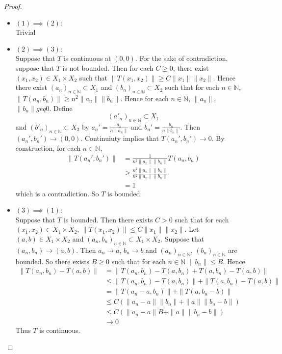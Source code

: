 \documentclass[12pt]{amsart}
\theoremstyle{definition}
\newcommand{\N}{\mathbb{N}}
\begin{document}
	\begin{proof}\
		\begin{itemize}
		\item $(1) \implies (2)$:\\
		Trivial
		\item  $(2) \implies (3)$:\\ 
		Suppose that $T$ is continuous at $(0, 0)$. For the sake of contradiction, suppose that $T$ is not bounded. Then for each $C \geq 0$, there exist $(x_1, x_2) \in X_1 \times X_2$ such that $\|T(x_1, x_2)\| \geq C\|x_1\| \|x_2\|$. Hence there exist $(a_n)_{n \in \N} \subset X_1$ and $(b_n)_{n \in \N} \subset X_2$ such that for each $n \in \N$, $ \| T(a_n, b_n) \| \geq n^2 \|a_n\| \|b_n\|$. Hence for each $n \in \N$, $\|a_n\|$, $\|b_n\|geq 0$. Define $$(a'_n)_{n \in \N} \subset X_1$$ and $(b'_n)_{n \in \N} \subset X_2$ by $a_n' = \frac{a_n}{n\|a_n\|}$ and $b_n' = \frac{b_n}{n\|b_n\|}$. Then $(a_n', b_n') \rightarrow (0,0)$. Continuiuty implies that $T(a_n',b_n') \rightarrow 0$. By construction, for each $n \in \N$,
		\begin{align*}
		\|T(a_n',b_n')\| 
		&= \frac{1}{n^2 \|a_n\| \|b_n\|} T(a_n, b_n) \\
		& \geq \frac{n^2 \|a_n\| \|b_n\|}{n^2 \|a_n\| \|b_n\|} \\
		&= 1
		\end{align*}
		which is a contradiction. So $T$ is bounded.
		\item  $(3) \implies (1)$:\\ 
		Suppose that $T$ is bounded. Then there exists $C > 0$ such that for each $(x_1, x_2) \in X_1 \times X_2$, $\| T(x_1, x_2) \| \leq C\|x_1\| \|x_2\|$. Let $(a, b) \in X_1 \times X_2$ and $(a_n, b_n)_{n \in \N} \subset X_1 \times X_2$. Suppose that $(a_n, b_n) \rightarrow (a,b)$. Then $a_n \rightarrow a$, $b_n \rightarrow b$ and $(a_n)_{n \in \N}$, $(b_n)_{n \in \N}$ are bounded. So there exists $B \geq 0$ such that for each $n \in \N$ $\|b_n\| \leq B$. Hence 
		\begin{align*}
		\|T(a_n,b_n) - T(a,b) \|
		&= \|T(a_n,b_n) - T(a, b_n) + T(a, b_n) - T(a,b) \| \\
		& \leq \|T(a_n,b_n) - T(a, b_n) \| + \|T(a, b_n) - T(a,b) \| \\
		&= \|T(a_n - a,b_n) \| + \|T(a, b_n - b)\| \\
		& \leq C(\|a_n - a\| \|b_n\| + \|a\|\|b_n - b\|) \\
		& \leq C(\|a_n - a\| B + \|a\|\|b_n - b\|) \\
		& \rightarrow 0
		\end{align*}
		Thus $T$ is continuous. 
		\end{itemize}
	\end{proof}
	
\end{document}
